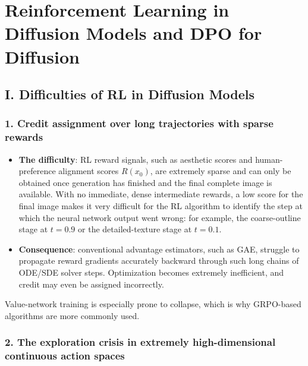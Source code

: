 \setcounter{section}{6}

\hypertarget{reinforcement-learning-in-diffusion-models-and-dpo-for-diffusion}{%
\section{Reinforcement Learning in Diffusion Models and DPO for Diffusion}\label{reinforcement-learning-in-diffusion-models-and-dpo-for-diffusion}}

\hypertarget{i.-difficulties-of-rl-in-diffusion-models}{%
\subsection{I. Difficulties of RL in Diffusion Models}\label{i.-difficulties-of-rl-in-diffusion-models}}

\hypertarget{credit-assignment-over-long-trajectories-with-sparse-rewards}{%
\subsubsection{1. Credit assignment over long trajectories with sparse rewards}\label{credit-assignment-over-long-trajectories-with-sparse-rewards}}

\begin{itemize}
\tightlist
\item
  \textbf{The difficulty}: RL reward signals, such as aesthetic scores and human-preference alignment scores \(R(x_0)\), are extremely sparse and can only be obtained once generation has finished and the final complete image is available. With no immediate, dense intermediate rewards, a low score for the final image makes it very difficult for the RL algorithm to identify the step at which the neural network output went wrong: for example, the coarse-outline stage at \(t=0.9\) or the detailed-texture stage at \(t=0.1\).
\item
  \textbf{Consequence}: conventional advantage estimators, such as GAE, struggle to propagate reward gradients accurately backward through such long chains of ODE/SDE solver steps. Optimization becomes extremely inefficient, and credit may even be assigned incorrectly.
\end{itemize}

Value-network training is especially prone to collapse, which is why GRPO-based algorithms are more commonly used.

\hypertarget{the-exploration-crisis-in-extremely-high-dimensional-continuous-action-spaces}{%
\subsubsection{2. The exploration crisis in extremely high-dimensional continuous action spaces}\label{the-exploration-crisis-in-extremely-high-dimensional-continuous-action-spaces}}

